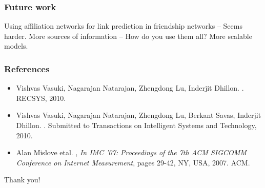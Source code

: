 \documentclass[handout]{beamer}
\begin{document}
\begin{frame}
\frametitle{Future work}
\begin{itemize}
\pitem Using affiliation networks for link prediction in friendship networks -- Seems harder.
\pitem More sources of information -- How do you use them all?
\pitem More scalable models.
\end{itemize}
\end{frame}

\begin{frame}
\frametitle{References}
\begin{itemize}
\item Vishvas Vasuki, Nagarajan Natarajan, Zhengdong Lu, Inderjit Dhillon. . RECSYS, 2010.
\item Vishvas Vasuki, Nagarajan Natarajan, Zhengdong Lu, Berkant Savas, Inderjit Dhillon. . Submitted to Transactions on Intelligent Systems and Technology, 2010.
\item Alan Mislove etal. , \emph{In IMC '07: Proceedings of the 7th ACM SIGCOMM Conference on Internet Measurement}, pages 29-42, NY, USA, 2007. ACM.
\end{itemize}
\end{frame}

\begin{frame}{}
  \hspace{1.1in}
  \centerline{\huge{Thank you!}}
\end{frame}

%
%

%
\end{document}
